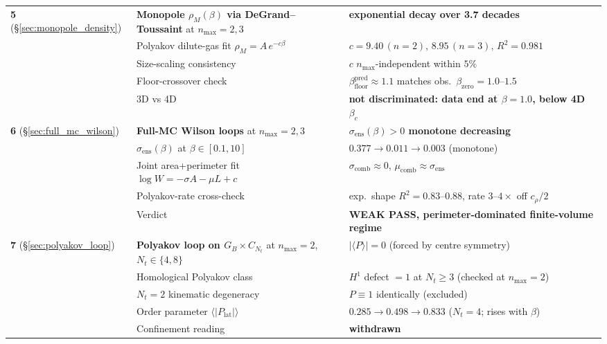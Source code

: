 \documentclass[11pt]{article}
\begin{document}
\begin{center}
\begin{tabular}{lll}
\midrule
\textbf{5} (\S\ref{sec:monopole_density}) &
  \textbf{Monopole $\rho_M(\beta)$ via DeGrand--Toussaint} at $n_\text{max}=2,3$ &
  \textbf{exponential decay over 3.7 decades} \\
  & Polyakov dilute-gas fit $\rho_M=A\,e^{-c\beta}$ &
  $c=9.40\,(n=2),\,8.95\,(n=3),\,R^2=0.981$ \\
  & Size-scaling consistency &
  $c$ $n_\text{max}$-independent within $5\%$ \\
  & Floor-crossover check &
  $\beta_\text{floor}^\text{pred}\approx 1.1$ matches obs.\ $\beta_\text{zero}=1.0$--$1.5$ \\
  & 3D vs 4D &
  \textbf{not discriminated: data end at $\beta = 1.0$, below 4D $\beta_c$} \\
\midrule
\textbf{6} (\S\ref{sec:full_mc_wilson}) &
  \textbf{Full-MC Wilson loops} at $n_\text{max}=2,3$ &
  \textbf{$\sigma_\text{ens}(\beta)>0$ monotone decreasing} \\
  & $\sigma_\text{ens}(\beta)$ at $\beta\in[0.1,10]$ &
  $0.377\to 0.011\to 0.003$ (monotone) \\
  & Joint area+perimeter fit $\log W=-\sigma A-\mu L+c$ &
  $\sigma_\text{comb}\approx 0$, $\mu_\text{comb}\approx\sigma_\text{ens}$ \\
  & Polyakov-rate cross-check &
  exp.\ shape $R^2=0.83$--$0.88$, rate $3$--$4\times$ off $c_\rho/2$ \\
  & Verdict &
  \textbf{WEAK PASS, perimeter-dominated finite-volume regime} \\
\midrule
\textbf{7} (\S\ref{sec:polyakov_loop}) &
  \textbf{Polyakov loop on $G_B\times C_{N_t}$} at $n_\text{max}=2$, $N_t\in\{4,8\}$ &
  $|\langle P\rangle|=0$ (forced by centre symmetry) \\
  & Homological Polyakov class &
  $H^1$ defect $=1$ at $N_t\ge 3$ (checked at $n_\text{max}=2$) \\
  & $N_t=2$ kinematic degeneracy &
  $P\equiv 1$ identically (excluded) \\
  & Order parameter $\langle |P_\text{lat}| \rangle$ &
  $0.285\to 0.498\to 0.833$ ($N_t=4$; rises with $\beta$) \\
  & Confinement reading &
  \textbf{withdrawn} \\
\bottomrule
\end{tabular}
\end{center}
\end{document}
